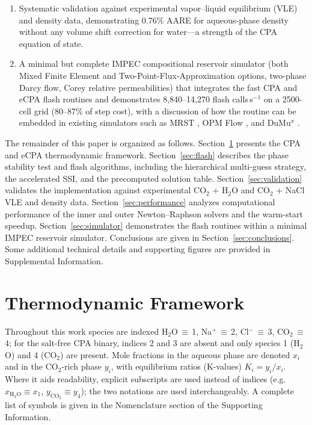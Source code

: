\documentclass[preprint,12pt,authoryear]{elsarticle}
\begin{document}
\begin{enumerate}
        tracing, and stability mapping; temperature and salinity continuation within the table
        build to maximize convergence rates; and a logarithmic pressure axis for the interpolation
        grid.
  \item Systematic validation against experimental vapor--liquid equilibrium (VLE) and density data,
        demonstrating 0.76\% AARE for aqueous-phase density without any volume shift correction
        for water---a strength of the CPA equation of state.
  \item A minimal but complete IMPEC compositional reservoir simulator (both Mixed Finite Element and Two-Point-Flux-Approximation options,
        two-phase Darcy flow, Corey relative permeabilities) that integrates the fast
        CPA and eCPA flash routines and demonstrates 8{,}840--14{,}270 flash calls\,s$^{-1}$ on a 2500-cell
        grid (80--87\% of step cost), with a discussion of how the routine can be embedded
        in existing simulators such as MRST \citep{Lie2019}, OPM Flow \citep{Rasmussen2021}, and DuMu$^x$ \citep{Koch2021}.
\end{enumerate}

The remainder of this paper is organized as follows.
Section~\ref{sec:eos} presents the CPA and eCPA thermodynamic framework.
Section~\ref{sec:flash} describes the phase stability test and flash algorithms,
including the hierarchical multi-guess strategy, the accelerated SSI, and the
precomputed solution table.
Section~\ref{sec:validation} validates the implementation against experimental
CO$_2$ + H$_2$O and CO$_2$ + NaCl VLE and density data.
Section~\ref{sec:performance} analyzes computational performance of the inner and
outer Newton--Raphson solvers and the warm-start speedup.
Section~\ref{sec:simulator} demonstrates the flash routines within a minimal
IMPEC reservoir simulator.
Conclusions are given in Section~\ref{sec:conclusions}.
Some additional technical details and supporting figures are provided in Supplemental Information. 

\section{Thermodynamic Framework}
\label{sec:eos}

Throughout this work species are indexed H$_2$O\,$\equiv$\,1, Na$^+$\,$\equiv$\,2,
Cl$^-$\,$\equiv$\,3, CO$_2$\,$\equiv$\,4; for the salt-free CPA binary, indices 2 and 3
are absent and only species 1 (H$_2$O) and 4 (CO$_2$) are present.
Mole fractions in the aqueous phase are denoted $x_i$ and in the CO$_2$-rich phase $y_i$,
with equilibrium ratios (K-values) $K_i = y_i/x_i$.
Where it aids readability, explicit subscripts are used instead of indices
(e.g.\ $x_{\mathrm{H_2O}} \equiv x_1$, $y_{\mathrm{CO_2}} \equiv y_4$);
the two notations are used interchangeably.
A complete list of symbols is given in the Nomenclature section of the Supporting Information.
\end{document}

